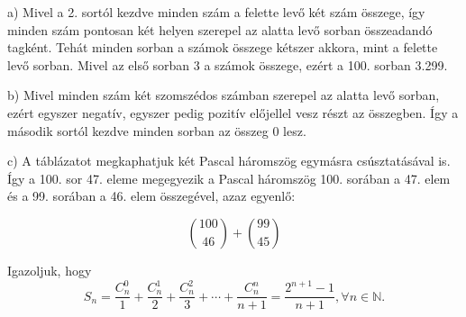 \begin{solution}
a) Mivel a 2. sortól kezdve minden szám a felette levő két szám összege,
így minden szám pontosan két helyen szerepel az alatta levő sorban
összeadandó tagként. Tehát minden sorban a számok összege kétszer
akkora, mint a felette levő sorban. Mivel az első sorban 3 a számok
összege, ezért a 100. sorban 3.299.

b) Mivel minden szám két szomszédos számban szerepel az alatta levő
sorban, ezért egyszer negatív, egyszer pedig pozitív előjellel vesz
részt az összegben. Így a második sortól kezdve minden sorban az összeg
0 lesz.

c) A táblázatot megkaphatjuk két Pascal háromszög egymásra csúsztatásával
is. Így a 100. sor 47. eleme megegyezik a Pascal háromszög 100. sorában
a 47. elem és a 99. sorában a 46. elem összegével, azaz egyenlő:

\[
\binom{100}{46}+\binom{99}{45}
\]
\end{solution}
\begin{extraproblem}
Igazoljuk, hogy 
\[
S_{n}=\dfrac{C_{n}^{0}}{1}+\dfrac{C_{n}^{1}}{2}+\dfrac{C_{n}^{2}}{3}+\cdots+\dfrac{C_{n}^{n}}{n+1}=\dfrac{2^{n+1}-1}{n+1},\forall n\in\mathbb{N}.
\]
\end{extraproblem}

